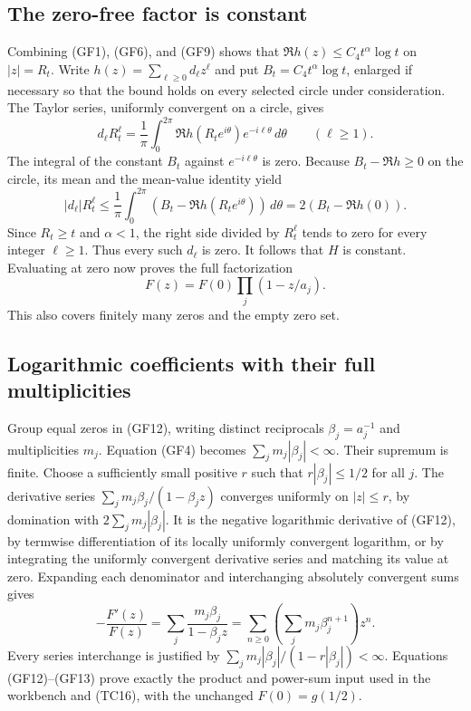 \subsection{The zero-free factor is constant}
Combining (GF1), (GF6), and (GF9) shows that
$\Re h(z)\le C_4t^\alpha\log t$ on $|z|=R_t$.
Write $h(z)=\sum_{\ell\ge0}d_\ell z^\ell$ and put
$B_t=C_4t^\alpha\log t$, enlarged if necessary so that the bound
holds on every selected circle under consideration.
The Taylor series, uniformly convergent on a circle, gives
\[
d_\ell R_t^\ell=
\frac1{\pi}\int_0^{2\pi}\Re h(R_te^{i\theta})
e^{-i\ell\theta}\,d\theta\qquad(\ell\ge1).
\tag{GF10}
\]
The integral of the constant $B_t$ against
$e^{-i\ell\theta}$ is zero. Because
$B_t-\Re h\ge0$ on the circle, its mean and the mean-value
identity yield
\[
|d_\ell|R_t^\ell
\le\frac1\pi\int_0^{2\pi}(B_t-\Re h(R_te^{i\theta}))\,d\theta
=2(B_t-\Re h(0)).
\tag{GF11}
\]
Since $R_t\ge t$ and $\alpha<1$, the right side divided by
$R_t^\ell$ tends to zero for every integer $\ell\ge1$.
Thus every such $d_\ell$ is zero. It follows that $H$ is
constant. Evaluating at zero now proves the full factorization
\[
F(z)=F(0)\prod_j(1-z/a_j).
\tag{GF12}
\]
This also covers finitely many zeros and the empty zero set.

\subsection{Logarithmic coefficients with their full multiplicities}
Group equal zeros in (GF12), writing distinct reciprocals
$\beta_j=a_j^{-1}$ and multiplicities $m_j$. Equation (GF4)
becomes $\sum_jm_j|\beta_j|<\infty$.
Their supremum is finite. Choose a sufficiently small positive
$r$ such that $r|\beta_j|\le1/2$ for all $j$.
The derivative series
$\sum_jm_j\beta_j/(1-\beta_j z)$ converges uniformly on
$|z|\le r$, by domination with $2\sum_jm_j|\beta_j|$.
It is the negative logarithmic derivative of (GF12), by
termwise differentiation of its locally uniformly convergent
logarithm, or by integrating the uniformly convergent derivative
series and matching its value at zero. Expanding each denominator
and interchanging absolutely convergent sums gives
\[
-\frac{F'(z)}{F(z)}
=\sum_j\frac{m_j\beta_j}{1-\beta_jz}
=\sum_{n\ge0}
\left(\sum_jm_j\beta_j^{n+1}\right)z^n .
\tag{GF13}
\]
Every series interchange is justified by
$\sum_jm_j|\beta_j|/(1-r|\beta_j|)<\infty$.
Equations (GF12)--(GF13) prove exactly the product and power-sum
input used in the workbench and (TC16), with the unchanged
$F(0)=g(1/2)$.
